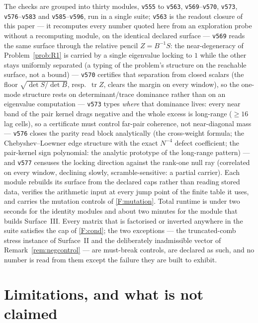 \documentclass[11pt,a4paper]{article}
\theoremstyle{plain}
\theoremstyle{definition}
\begin{document}
The checks are grouped into thirty modules, \texttt{v555} to \texttt{v563},
\texttt{v569}--\texttt{v570}, \texttt{v573}, \texttt{v576}--\texttt{v583} and
\texttt{v585}--\texttt{v596}, run in a single suite; \texttt{v563} is the readout closure of
this paper --- it recomputes every number quoted here from an exploration probe
without a recomputing module, on the identical declared surface ---
\texttt{v569} reads the same surface through the relative pencil
$Z=B^{-1}S$: the near-degeneracy of Problem~\ref{prob:R1} is carried by a
single eigenvalue locking to $1$ while the other stays uniformly separated
(a typing of the problem's structure on the reachable surface, not a bound)
--- \texttt{v570} certifies that separation from closed scalars (the
floor $\sqrt{\det S/\det B}$, resp.\ $\operatorname{tr}Z$, clears the margin
on every window), so the one-mode structure rests on determinant/trace
dominance rather than on an eigenvalue computation --- \texttt{v573}
types \emph{where} that dominance lives: every near band of the pair kernel
drags negative and the whole excess is long-range ($\ge16$ lag cells), so a
certificate must control far-pair coherence, not near-diagonal mass ---
\texttt{v576} closes the parity read block analytically (the cross-weight
formula; the Chebyshev--Loewner edge structure with the exact $N^{-4}$
defect coefficient; the pair-kernel sign polynomial: the analytic prototype
of the long-range pattern) --- and \texttt{v577} censuses the locking
direction against the rank-one null ray (correlated on every window,
declining slowly, scramble-sensitive: a partial carrier).
Each module rebuilds its surface from the declared caps
rather than reading stored data, verifies the arithmetic input at every jump
point of the finite table it uses, and carries the mutation controls of
\ref{F:mutation}. Total runtime is under two seconds for the identity modules
and about two minutes for the module that builds Surface~III. Every matrix that
is factorised or inverted anywhere in the suite satisfies the cap of
\ref{F:cond}; the two exceptions --- the truncated-comb stress instance of
Surface~II and the deliberately inadmissible vector of
Remark~\ref{rem:negcontrol} --- are must-break controls, are declared as such,
and no number is read from them except the failure they are built to exhibit.

\section{Limitations, and what is not claimed}
\label{sec:limits}
\end{document}
